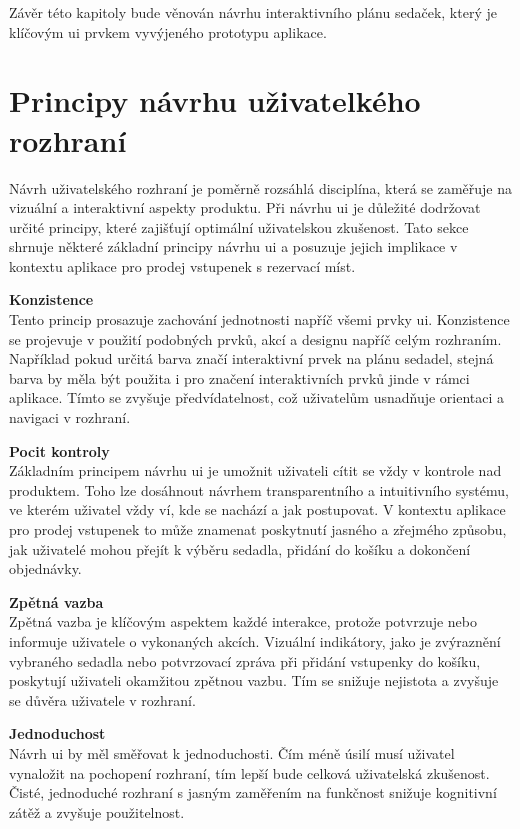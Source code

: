 Závěr této kapitoly bude věnován návrhu interaktivního plánu sedaček, který je klíčovým \ac{ui} prvkem vyvýjeného prototypu aplikace.

\section{Principy návrhu uživatelkého rozhraní}
\label{sec:navrh-principy}
Návrh uživatelského rozhraní je poměrně rozsáhlá disciplína, která se zaměřuje na vizuální a interaktivní aspekty produktu.
Při návrhu \ac{ui} je důležité dodržovat určité principy, které zajišťují optimální uživatelskou zkušenost.
Tato sekce shrnuje některé základní principy návrhu \ac{ui} a posuzuje jejich implikace v kontextu aplikace pro prodej vstupenek s rezervací míst.

\textbf{Konzistence}\\
Tento princip prosazuje zachování jednotnosti napříč všemi prvky \ac{ui}.
Konzistence se projevuje v použití podobných prvků, akcí a designu napříč celým rozhraním.
Například pokud určitá barva značí interaktivní prvek na plánu sedadel, stejná barva by měla být použita i pro značení interaktivních prvků jinde v rámci aplikace.
Tímto se zvyšuje předvídatelnost, což uživatelům usnadňuje orientaci a navigaci v rozhraní.

\textbf{Pocit kontroly}\\
Základním principem návrhu \ac{ui} je umožnit uživateli cítit se vždy v kontrole nad produktem.
Toho lze dosáhnout návrhem transparentního a intuitivního systému, ve kterém uživatel vždy ví, kde se nachází a jak postupovat.
V kontextu aplikace pro prodej vstupenek to může znamenat poskytnutí jasného a zřejmého způsobu, jak uživatelé mohou přejít k výběru sedadla, přidání do košíku a dokončení objednávky.

\textbf{Zpětná vazba}\\
Zpětná vazba je klíčovým aspektem každé interakce, protože potvrzuje nebo informuje  uživatele o vykonaných akcích.
Vizuální indikátory, jako je zvýraznění vybraného sedadla nebo potvrzovací zpráva při přidání vstupenky do košíku, poskytují uživateli okamžitou zpětnou vazbu.
Tím se snižuje nejistota a zvyšuje se důvěra uživatele v rozhraní.

\textbf{Jednoduchost}\\
Návrh \ac{ui} by měl směřovat k jednoduchosti.
Čím méně úsilí musí uživatel vynaložit na pochopení rozhraní, tím lepší bude celková uživatelská zkušenost.
Čisté, jednoduché rozhraní s jasným zaměřením na funkčnost snižuje kognitivní zátěž a zvyšuje použitelnost.

